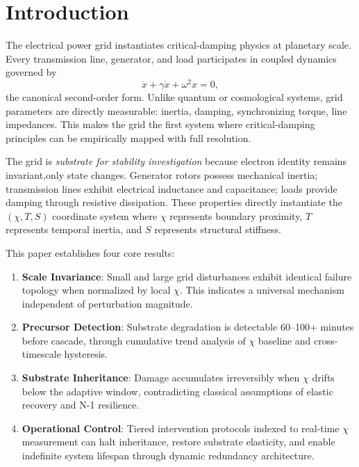 \documentclass[11pt,letterpaper]{article}
\begin{document}
\section{Introduction}

The electrical power grid instantiates critical-damping physics at planetary scale. Every transmission line, generator, and load participates in coupled dynamics governed by
\begin{equation}
\ddot{x} + \gamma \dot{x} + \omega^2 x = 0,
\label{eq:canonical}
\end{equation}
the canonical second-order form. Unlike quantum or cosmological systems, grid parameters are directly measurable: inertia, damping, synchronizing torque, line impedances. This makes the grid the first system where critical-damping principles can be empirically mapped with full resolution.

The grid is \textit{substrate for stability investigation} because electron identity remains invariant,only state changes. Generator rotors possess mechanical inertia; transmission lines exhibit electrical inductance and capacitance; loads provide damping through resistive dissipation. These properties directly instantiate the $(\chi, T, S)$ coordinate system where $\chi$ represents boundary proximity, $T$ represents temporal inertia, and $S$ represents structural stiffness.

This paper establishes four core results:

\begin{enumerate}
\item \textbf{Scale Invariance}: Small and large grid disturbances exhibit identical failure topology when normalized by local $\chi$. This indicates a universal mechanism independent of perturbation magnitude.

\item \textbf{Precursor Detection}: Substrate degradation is detectable 60--100+ minutes before cascade, through cumulative trend analysis of $\chi$ baseline and cross-timescale hysteresis.

\item \textbf{Substrate Inheritance}: Damage accumulates irreversibly when $\chi$ drifts below the adaptive window, contradicting classical assumptions of elastic recovery and N-1 resilience.

\item \textbf{Operational Control}: Tiered intervention protocols indexed to real-time $\chi$ measurement can halt inheritance, restore substrate elasticity, and enable indefinite system lifespan through dynamic redundancy architecture.
\end{enumerate}
\end{document}
